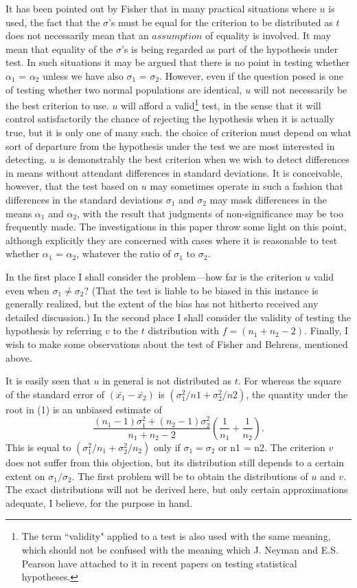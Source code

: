 \documentclass[12pt]{article}
\begin{document}
It has been pointed out by Fisher that in many practical situations where $u$ is
used, the fact that the $\sigma$'s must be equal for the criterion to be
distributed as $t$ does not necessarily mean that an $\textit{assumption}$ of equality is
involved. It may mean that equality of the $\sigma$'s is being regarded as part of
the hypothesis under test. In such situations it may be argued that there is no
point in testing whether $\alpha_1$ = $\alpha_2$ unless we have also $\sigma_1$
= $\sigma_2$.  However, even if the question posed is one of testing whether two
normal populations are identical, $u$ will not necessarily be the best
criterion to use. $u$ will afford a valid\footnote{The term ``validity" applied to a test is also used with the same meaning, which should not be confused with the meaning which J. Neyman and E.S. Pearson have attached to it in recent papers on testing statistical hypotheses.} test, in the sense that it will control
satisfactorily the chance of rejecting the hypothesis when it is actually true,
but it is only one of many such. the choice of criterion must depend on what
sort of departure from the hypothesis under the test we are most interested in
detecting. $u$ is demonstrably the best criterion when we wish to detect
differences in means without attendant differences in standard deviations. It is
conceivable, however, that the test based on $u$ may sometimes operate in such a
fashion that differences in the standard deviations $\sigma_1$ and $\sigma_2$
may mask differences in the means $\alpha_1$ and $\alpha_2$, with the result
that judgments of non-significance may be too frequently made. The
investigations in this paper throw some light on this point, although explicitly
they are concerned with cases where it is reasonable to test whether $\alpha_1$
= $\alpha_2$, whatever the ratio of $\sigma_1$ to $\sigma_2$.

In the first place I shall consider the problem---how far is the criterion $u$
valid even when $\sigma_1 \neq \sigma_2$? (That the test is liable to be biased in
this instance is generally realized, but the extent of the bias has not hitherto
received any detailed discussion.) In the second place I shall consider the
validity of testing the hypothesis by referring $v$ to the $t$ distribution with
$f=(n_1+n_2-2)$. Finally, I wish to make some observations about the test of Fisher
and Behrens, mentioned above.

It is easily seen that $u$ in general is not distributed as $t$. For whereas the
square of the standard error of $(\bar{x_1}-\bar{x_2})$ is
$(\sigma_1^2/n1+\sigma_2^2/n2)$, the quantity under the root in (1) is an
unbiased estimate of
\[
\frac{(n_1-1)\sigma_1^2+(n_2-1)\sigma_2^2}{n_1+n_2-2}\left(\frac{1}{n_1}+\frac{1}{n_2}\right).
\]
This is equal to $(\sigma_1^2/n_1+\sigma_2^2/n_2)$ only if $\sigma_1 = \sigma_2$
or n1 = n2.  The criterion $v$ does not suffer from this objection, but its
distribution still depends to a certain extent on $\sigma_1/\sigma_2$. The first
problem will be to obtain the distributions of $u$ and $v$. The exact distributions
will not be derived here, but only certain approximations adequate, I believe,
for the purpose in hand.
\end{document}
